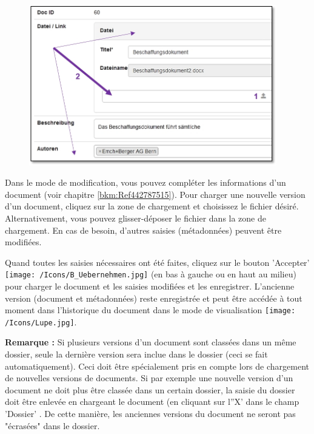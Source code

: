 \begin{figure}
\vspace{-10pt}
\includegraphics[height=70mm]{../chapters/11_Dokumentenablage/pictures/11-2-5_NeuesDokuHochladen.jpg}
\end{figure}
Dans le mode de modification, vous pouvez compléter les informations d'un document (voir chapitre \ref{bkm:Ref442787515}). Pour charger une nouvelle version d'un document, cliquez sur la zone de chargement  et choisissez le fichier désiré. Alternativement, vous pouvez glisser-déposer le fichier dans la zone de chargement. En cas de besoin, d'autres saisies (métadonnées) peuvent être modifiées.

\vspace{\baselineskip}

Quand toutes les saisies nécessaires ont été faites, cliquez sur le bouton 'Accepter' \texttt{[image: /Icons/B\_Uebernehmen.jpg]} (en bas à gauche ou en haut au milieu) pour charger le document et les saisies modifiées et les enregistrer. L'ancienne version (document et métadonnées) reste enregistrée et peut être accédée à tout moment dans l'historique du document dans le mode de visualisation \texttt{[image: /Icons/Lupe.jpg]}.

\vspace{\baselineskip}
\vspace{\baselineskip}

\textbf{Remarque :} Si plusieurs versions d'un document sont classées dans un même dossier, seule la dernière version sera inclue dans le dossier (ceci se fait automatiquement). Ceci doit être spécialement pris en compte lors de chargement de nouvelles versions de documents. Si par exemple une nouvelle version d'un document ne doit plus être classée dans un certain dossier, la saisie du dossier doit être enlevée en chargeant le document (en cliquant sur l''X' dans le champ 'Dossier' . De cette manière, les anciennes versions du document ne seront pas "écrasées" dans le dossier.

